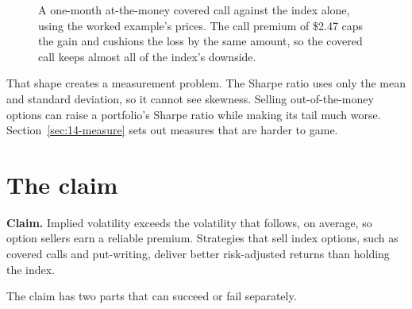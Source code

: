 \begin{figure}[htbp]
\centering
{}
\caption{A one-month at-the-money covered call against the index alone, using the worked example's prices. The call premium of \$2.47 caps the gain and cushions the loss by the same amount, so the covered call keeps almost all of the index's downside.}
\label{fig:14-cc}
\end{figure}

That shape creates a measurement problem. The Sharpe ratio uses only the mean and standard deviation, so it cannot see skewness. Selling out-of-the-money options can raise a portfolio's Sharpe ratio while making its tail much worse. Section~\ref{sec:14-measure} sets out measures that are harder to game.

\section{The claim}
\label{sec:14-claim}

\begin{callout}
\textbf{Claim.} Implied volatility exceeds the volatility that follows, on average, so option sellers earn a reliable premium. Strategies that sell index options, such as covered calls and put-writing, deliver better risk-adjusted returns than holding the index.
\end{callout}

The claim has two parts that can succeed or fail separately.

